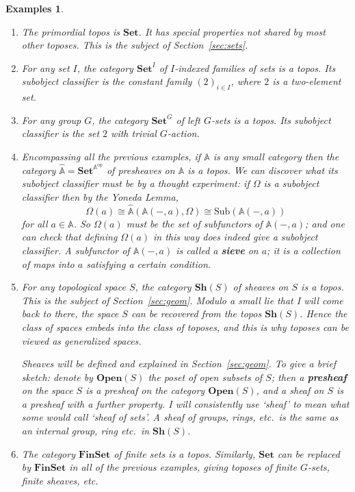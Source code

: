 \documentclass{article}
\newcommand{\dashbk}{-}
\newcommand{\fcat}[1]{\mathbf{#1}}
\newcommand{\op}{\mathrm{op}}
\newcommand{\Set}{\fcat{Set}}
\newcommand{\demph}[1]{\textbf{\textup{#1}}}
\newcommand{\scat}[1]{\mathbb{#1}}
\newcommand{\iso}{\cong}
\newcommand{\Sub}{\mathrm{Sub}}
\newcommand{\Psh}[1]{\widehat{#1}}
\newcommand{\Sh}{\fcat{Sh}}
\newcommand{\Open}{\fcat{Open}}
\newcommand{\FinSet}{\fcat{FinSet}}
\newtheorem{preexamples}[thm]{Examples}
\newenvironment{examples}{\begin{preexamples}\upshape}{\end{preexamples}}
\begin{document}
\begin{examples}        \label{egs:toposes}
\begin{enumerate}
\item  
The primordial topos is $\Set$.  It has special properties not shared by most
other toposes.  This is the subject of Section~\ref{sec:sets}.

\item 
For any set $I$, the category $\Set^I$ of $I$-indexed families of sets is a
topos.  Its subobject classifier is the constant family $(2)_{i \in I}$, where
$2$ is a two-element set.

\item 
For any group $G$, the category $\Set^G$ of left $G$-sets is a topos.  Its
subobject classifier is the set $2$ with trivial $G$-action.

\item   \label{eg:topos-pshf}
Encompassing all the previous examples, if $\scat{A}$ is any small category
then the category $\Psh{\scat{A}} = \Set^{\scat{A}^\op}$ of presheaves on
$\scat{A}$ is a topos.  We can discover what its subobject classifier must be
by a thought experiment: \emph{if} $\Omega$ is a subobject classifier then by
the Yoneda Lemma,
\[
\Omega(a) 
\iso
\Psh{\scat{A}}( \scat{A}(\dashbk, a), \Omega )
\iso
\Sub(\scat{A}(\dashbk, a))
\]
for all $a \in \scat{A}$.  So $\Omega(a)$ must be the set of subfunctors of
$\scat{A}(\dashbk, a)$; and one can check that defining $\Omega(a)$ in this
way does indeed give a subobject classifier.  A subfunctor of
$\scat{A}(\dashbk, a)$ is called a \demph{sieve} on $a$; it is a collection of
maps into $a$ satisfying a certain condition. 

\item For any topological space $S$, the category $\Sh(S)$ of sheaves on $S$
is a topos.  This is the subject of Section~\ref{sec:geom}.  Modulo a small
lie that I will come back to there, the space $S$ can be recovered from the
topos $\Sh(S)$.  Hence the class of spaces embeds into the class of toposes,
and this is why toposes can be viewed as generalized spaces.

Sheaves will be defined and explained in Section~\ref{sec:geom}.  To give a
brief sketch: denote by $\Open(S)$ the poset of open subsets of $S$; then a
\demph{presheaf} on the space $S$ is a presheaf on the category $\Open(S)$,
and a sheaf on $S$ is a presheaf with a further property.  I will
consistently use `sheaf' to mean what some would call `sheaf of sets'.  A
sheaf of groups, rings, etc.\ is the same as an internal group, ring etc.\ in
$\Sh(S)$.  

\item
The category $\FinSet$ of finite sets is a topos.  Similarly, $\Set$ can be
replaced by $\FinSet$ in all of the previous examples, giving toposes of
finite $G$-sets, finite sheaves, etc.  
\end{enumerate}
\end{examples}
\end{document}
